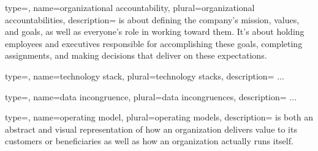 
 {
    type=\glsdefaulttype,
    name={organizational accountability},
    plural={organizational accountabilities},
    description={%
        is about defining the company's mission, values, and goals,
        as well as everyone's role in working toward them.
        It's about holding employees and executives responsible for accomplishing these goals, completing assignments,
        and making decisions that deliver on these expectations.
    }
}

 {
    type=\glsdefaulttype,
    name={technology stack},
    plural={technology stacks},
    description={%
        ...
    }
}

 {
    type=\glsdefaulttype,
    name={data incongruence},
    plural={data incongruences},
    description={%
        ...
    }
}

 {
    type=\glsdefaulttype,
    name={operating model},
    plural={operating models},
    description={%
        is both an abstract and visual representation of how an organization delivers value to its customers or
        beneficiaries as well as how an organization actually runs itself.
    }
}

